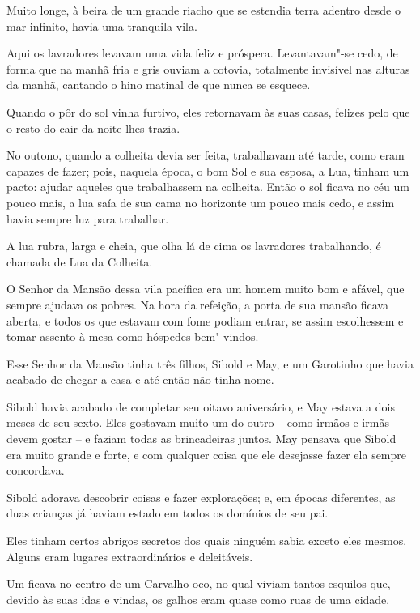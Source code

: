  

Muito longe, à beira de um grande riacho que se estendia terra adentro
desde o mar infinito, havia uma tranquila vila.

Aqui os lavradores levavam uma vida feliz e próspera. Levantavam"-se
cedo, de forma que na manhã fria e gris ouviam a cotovia, totalmente
invisível nas alturas da manhã, cantando o hino matinal de que nunca se
esquece.

Quando o pôr do sol vinha furtivo, eles retornavam às suas casas,
felizes pelo que o resto do cair da noite lhes trazia.

No outono, quando a colheita devia ser feita, trabalhavam até tarde,
como eram capazes de fazer; pois, naquela época, o bom Sol e sua esposa,
a Lua, tinham um pacto: ajudar aqueles que trabalhassem na colheita.
Então o sol ficava no céu um pouco mais, a lua saía de sua cama no
horizonte um pouco mais cedo, e assim havia sempre luz para trabalhar.

A lua rubra, larga e cheia, que olha lá de cima os lavradores
trabalhando, é chamada de Lua da Colheita.

O Senhor da Mansão dessa vila pacífica era um homem muito bom e afável,
que sempre ajudava os pobres. Na hora da refeição, a porta de sua mansão
ficava aberta, e todos os que estavam com fome podiam entrar, se assim
escolhessem e tomar assento à mesa como hóspedes bem"-vindos.

Esse Senhor da Mansão tinha três filhos, Sibold e May, e um Garotinho
que havia acabado de chegar a casa e até então não tinha nome.

Sibold havia acabado de completar seu oitavo aniversário, e May estava a
dois meses de seu sexto. Eles gostavam muito um do outro -- como irmãos
e irmãs devem gostar -- e faziam todas as brincadeiras juntos. May
pensava que Sibold era muito grande e forte, e com qualquer coisa que
ele desejasse fazer ela sempre concordava.

Sibold adorava descobrir coisas e fazer explorações; e, em épocas
diferentes, as duas crianças já haviam estado em todos os domínios de
seu pai.

Eles tinham certos abrigos secretos dos quais ninguém sabia exceto eles
mesmos. Alguns eram lugares extraordinários e deleitáveis.

Um ficava no centro de um Carvalho oco, no qual viviam tantos esquilos
que, devido às suas idas e vindas, os galhos eram quase como ruas de uma
cidade.


